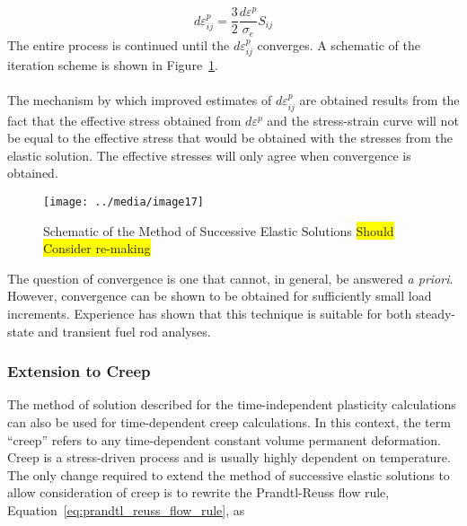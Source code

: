 \begin{equation}
    d\varepsilon_{ij}^{p} = \frac{3}{2}\frac{d\varepsilon^{p}}{\sigma_{e}}S_{ij}
    \label{eq:new_estimate_prandtl_reuss_flow_rule}
\end{equation}
The entire process is continued until the \(d\varepsilon_{ij}^{p}\) converges. A schematic of the
iteration scheme is shown in Figure~\ref{fig:schematic_method_success_elastic_solns}.
\\
\\
The mechanism by which improved estimates of \(d\varepsilon_{ij}^{p}\) are obtained results from the
fact that the effective stress obtained from \(d\varepsilon^{p}\) and the stress-strain curve will
not be equal to the effective stress that would be obtained with the stresses from the elastic
solution. The effective stresses will only agree when convergence is obtained.

\begin{figure}
    \texttt{[image: ../media/image17]}
    \caption{Schematic of the Method of Successive Elastic Solutions \colorbox{yellow}{Should Consider re-making}}
    \label{fig:schematic_method_success_elastic_solns}
\end{figure}

The question of convergence is one that cannot, in general, be answered \textit{a priori}. However,
convergence can be shown to be obtained for sufficiently small load increments. Experience has shown
that this technique is suitable for both steady-state and transient fuel rod analyses.

\subsubsection{Extension to Creep}\label{section:extension-to-creep}

The method of solution described for the time-independent plasticity calculations can also be used
for time-dependent creep calculations. In this context, the term ``creep'' refers to any
time-dependent constant volume permanent deformation. Creep is a stress-driven process and is
usually highly dependent on temperature.  The only change required to extend the method of
successive elastic solutions to allow consideration of creep is to rewrite the Prandtl-Reuss flow
rule, Equation~\ref{eq:prandtl_reuss_flow_rule}, as

